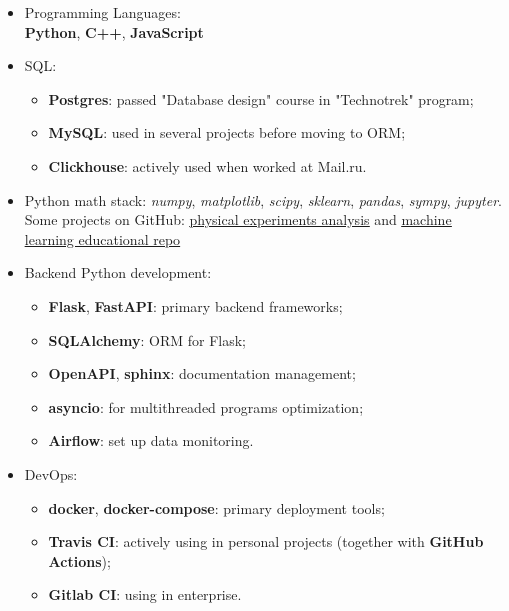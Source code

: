 \begin{itemize}
	\item Programming Languages: \\ 
        \textbf{Python}, \textbf{C++}, \textbf{JavaScript}
    \item SQL: 
        \begin{itemize}
            \item \textbf{Postgres}: passed "Database design" course in "Technotrek" program;
            \item \textbf{MySQL}: used in several projects before moving to ORM;
            \item \textbf{Clickhouse}: actively used when worked at Mail.ru.
        \end{itemize}
    \item Python math stack: \textit{numpy}, \textit{matplotlib}, \textit{scipy}, \textit{sklearn}, \textit{pandas}, \textit{sympy}, \textit{jupyter}. 
    Some projects on GitHub: \href{https://github.com/alekseik1/phys\_labs}{\underline{physical experiments analysis}} and \href{https://github.com/alekseik1/machine\_learning\_coursera}{\underline{machine learning educational repo}}
    \item Backend Python development: 
        \begin{itemize}
            \item \textbf{Flask}, \textbf{FastAPI}: primary backend frameworks;
            \item \textbf{SQLAlchemy}: ORM for Flask;
            \item \textbf{OpenAPI}, \textbf{sphinx}: documentation management;
            \item \textbf{asyncio}: for multithreaded programs optimization;
            \item \textbf{Airflow}: set up data monitoring.
        \end{itemize}
    \item DevOps: 
        \begin{itemize}
            \item \textbf{docker}, \textbf{docker-compose}: primary deployment tools;
            \item \textbf{Travis CI}: actively using in personal projects (together with \textbf{GitHub Actions});
            \item \textbf{Gitlab CI}: using in enterprise.
        \end{itemize}
\end{itemize}

